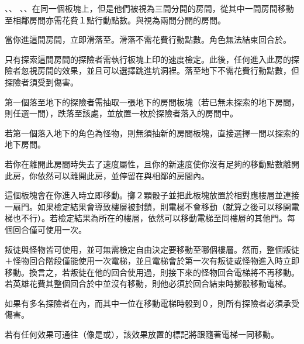 \begin{RuleBox}{、、}
  、、在同一個板塊上，但是他們被視為三間分開的房間，從其中一間房間移動至相鄰房間亦需花費１點行動點數。與視為兩間分開的房間。
\end{RuleBox}

\begin{RuleBox}{}
  當你進這間房間，立即滑落至。滑落不需花費行動點數。角色無法結束回合於。
\end{RuleBox}

\begin{RuleBox}{}
  只有探索這間房間的探險者需執行板塊上印的速度檢定。此後，任何進入此房的探險者忽視房間的效果，並且可以選擇跳進坑洞裡。落至地下不需花費行動點數，但探險者須受到傷害。

  第一個落至地下的探險者需抽取一張地下的房間板塊（若已無未探索的地下房間，則任選一間），跌落至該處，並放置一枚於探險者落入的房間中。

  若第一個落入地下的角色為怪物，則無須抽新的房間板塊，直接選擇一間以探索的地下房間。
\end{RuleBox}

\begin{RuleBox}{}
  若你在離開此房間時失去了速度屬性，且你的新速度使你沒有足夠的移動點數離開此房，你依然可以離開此房，並停留在與相鄰的房間內。
\end{RuleBox}

\begin{RuleBox}{}
  這個板塊會在你進入時立即移動。擲２顆骰子並把此板塊放置於相對應樓層並連接一扇門。如果檢定結果會導致樓層被封鎖，則電梯不會移動（就算之後可以移開電梯也不行）。若檢定結果為所在的樓層，依然可以移動電梯至同樓層的其他門。每個回合僅可使用一次。

  叛徒與怪物皆可使用，並可無需檢定自由決定要移動至哪個樓層。然而，整個叛徒＋怪物回合階段僅能使用一次電梯，並且電梯會於第一次有叛徒或怪物進入時立即移動。換言之，若叛徒在他的回合使用過，則接下來的怪物回合電梯將不再移動。若英雄花費其整個回合於中並沒有移動，則他必須於回合結束時擲骰移動電梯。

  如果有多名探險者在內，而其中一位在移動電梯時骰到０，則所有探險者必須承受傷害。

  若有任何效果可通往（像是或），該效果放置的標記將跟隨著電梯一同移動。
\end{RuleBox}

